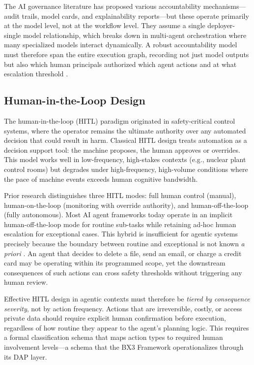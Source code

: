 The AI governance literature has proposed various accountability mechanisms—audit trails, model cards, and explainability reports—but these operate primarily at the model level, not at the workflow level. They assume a single deployer-single model relationship, which breaks down in multi-agent orchestration where many specialized models interact dynamically. A robust accountability model must therefore span the entire execution graph, recording not just model outputs but also which human principals authorized which agent actions and at what escalation threshold \cite{tristr81}.

\subsection{Human-in-the-Loop Design}

The human-in-the-loop (HITL) paradigm originated in safety-critical control systems, where the operator remains the ultimate authority over any automated decision that could result in harm. Classical HITL design treats automation as a decision support tool: the machine proposes, the human approves or overrides. This model works well in low-frequency, high-stakes contexts (e.g., nuclear plant control rooms) but degrades under high-frequency, high-volume conditions where the pace of machine events exceeds human cognitive bandwidth.

Prior research distinguishes three HITL modes: full human control (manual), human-on-the-loop (monitoring with override authority), and human-off-the-loop (fully autonomous). Most AI agent frameworks today operate in an implicit human-off-the-loop mode for routine sub-tasks while retaining ad-hoc human escalation for exceptional cases. This hybrid is insufficient for agentic systems precisely because the boundary between routine and exceptional is not known \textit{a priori} \cite{bansal2019}. An agent that decides to delete a file, send an email, or charge a credit card may be operating within its programmed scope, yet the downstream consequences of such actions can cross safety thresholds without triggering any human review.

Effective HITL design in agentic contexts must therefore be \textit{tiered by consequence severity}, not by action frequency. Actions that are irreversible, costly, or access private data should require explicit human confirmation before execution, regardless of how routine they appear to the agent's planning logic. This requires a formal classification schema that maps action types to required human involvement levels—a schema that the BX3 Framework operationalizes through its DAP layer.

